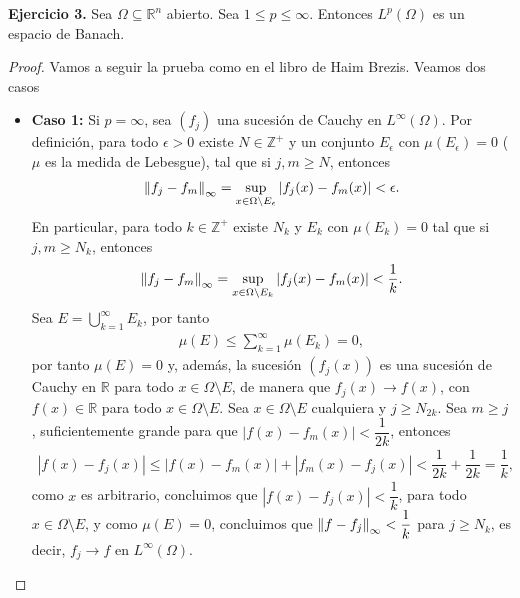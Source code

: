 

\textbf{Ejercicio 3.} Sea $\Omega\subseteq \mathbb{R}^n$ abierto. Sea $1\leq p\leq \infty$. Entonces $L^p(\Omega)$ es un espacio de Banach.

\begin{proof}
    Vamos a seguir la prueba como en el libro de Haim Brezis. Veamos dos casos
    \begin{itemize}
        \item \textbf{Caso 1:} Si $p=\infty$, sea $(f_j)$ una sucesión de Cauchy en $L^\infty(\Omega)$. Por definición, para todo $\epsilon>0$ existe $N\in \mathbb{Z}^+$ y un conjunto $E_\epsilon$ con $\mu(E_\epsilon)=0$ ($\mu$ es la medida de Lebesgue), tal que si $j,m\geq N$, entonces 
        \begin{align*}
            \left\|f_j-f_m\right\|_\infty=\sup_{x\in \Omega\setminus E_\epsilon}|f_j(x)-f_m(x)|<\epsilon.
        \end{align*}
        En particular, para todo $k \in \mathbb{Z}^+$ existe $N_k$ y $E_k$ con $\mu(E_k)=0$ tal que si $j,m\geq N_k$, entonces
        \begin{align*}
            \left\|f_j-f_m\right\|_\infty=\sup_{x \in\Omega\setminus E_k}|f_j(x)-f_m(x)|<\dfrac{1}{k}.
        \end{align*}
        Sea $\displaystyle E=\bigcup_{k=1}^\infty E_k$, por tanto
        \begin{align*}
            \mu(E)\leq \sum_{k=1}^\infty\mu(E_k)=0,
        \end{align*}
        por tanto $\mu(E)=0$ y, además, la sucesión $(f_j(x))$ es una sucesión de Cauchy en $\mathbb{R}$ para todo $x\in \Omega\setminus E$, de manera que $f_j(x)\to f(x)$, con $f(x)\in \mathbb{R}$ para todo $x \in \Omega\setminus E$. Sea $x \in \Omega\setminus E$ cualquiera y $j\geq N_{2k}$. Sea $m\geq j$, suficientemente grande para que $|f(x)-f_m(x)|<\dfrac{1}{2k}$, entonces
        \begin{align*}
            |f(x)-f_j(x)|\leq |f(x)-f_m(x)|+|f_m(x)-f_j(x)|<\dfrac{1}{2k}+\dfrac{1}{2k}=\dfrac{1}{k},
        \end{align*}
        como $x$ es arbitrario, concluimos que $|f(x)-f_j(x)|<\dfrac{1}{k}$, para todo $x \in \Omega\setminus E$, y como $\mu(E)=0$, concluimos que $\left\|f-f_j\right\|_\infty<\dfrac{1}{k}$ para $j\geq N_k$, es decir, $f_j\to f$ en $L^\infty(\Omega)$.


\end{itemize}
\end{proof}
